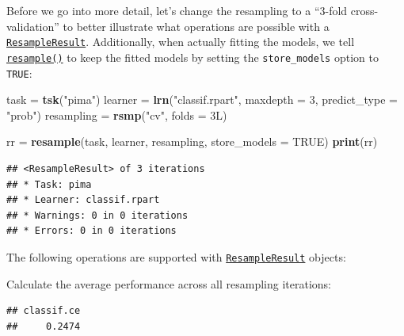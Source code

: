 \documentclass[]{article}
\newenvironment{Shaded}{\begin{snugshade}}{\end{snugshade}}
\newcommand{\DataTypeTok}[1]{\textcolor[rgb]{0.13,0.29,0.53}{#1}}
\newcommand{\DecValTok}[1]{\textcolor[rgb]{0.00,0.00,0.81}{#1}}
\newcommand{\KeywordTok}[1]{\textcolor[rgb]{0.13,0.29,0.53}{\textbf{#1}}}
\newcommand{\NormalTok}[1]{#1}
\newcommand{\OperatorTok}[1]{\textcolor[rgb]{0.81,0.36,0.00}{\textbf{#1}}}
\newcommand{\OtherTok}[1]{\textcolor[rgb]{0.56,0.35,0.01}{#1}}
\newcommand{\StringTok}[1]{\textcolor[rgb]{0.31,0.60,0.02}{#1}}
\renewenvironment{Shaded} {\begin{snugshade}\small} {\end{snugshade}}
\begin{document}
Before we go into more detail, let's change the resampling to a ``3-fold cross-validation'' to better illustrate what operations are possible with a \href{https://mlr3.mlr-org.com/reference/ResampleResult.html}{\texttt{ResampleResult}}.
Additionally, when actually fitting the models, we tell \href{https://mlr3.mlr-org.com/reference/resample.html}{\texttt{resample()}} to keep the fitted models by setting the \texttt{store\_models} option to \texttt{TRUE}:

\begin{Shaded}
\begin{Highlighting}[]
\NormalTok{task =}\StringTok{ }\KeywordTok{tsk}\NormalTok{(}\StringTok{"pima"}\NormalTok{)}
\NormalTok{learner =}\StringTok{ }\KeywordTok{lrn}\NormalTok{(}\StringTok{"classif.rpart"}\NormalTok{, }\DataTypeTok{maxdepth =} \DecValTok{3}\NormalTok{, }\DataTypeTok{predict_type =} \StringTok{"prob"}\NormalTok{)}
\NormalTok{resampling =}\StringTok{ }\KeywordTok{rsmp}\NormalTok{(}\StringTok{"cv"}\NormalTok{, }\DataTypeTok{folds =}\NormalTok{ 3L)}

\NormalTok{rr =}\StringTok{ }\KeywordTok{resample}\NormalTok{(task, learner, resampling, }\DataTypeTok{store_models =} \OtherTok{TRUE}\NormalTok{)}
\KeywordTok{print}\NormalTok{(rr)}
\end{Highlighting}
\end{Shaded}

\begin{verbatim}
## <ResampleResult> of 3 iterations
## * Task: pima
## * Learner: classif.rpart
## * Warnings: 0 in 0 iterations
## * Errors: 0 in 0 iterations
\end{verbatim}

The following operations are supported with \href{https://mlr3.mlr-org.com/reference/ResampleResult.html}{\texttt{ResampleResult}} objects:

Calculate the average performance across all resampling iterations:

\begin{Shaded}
\end{Shaded}

\begin{verbatim}
## classif.ce 
##     0.2474
\end{verbatim}
\end{document}
